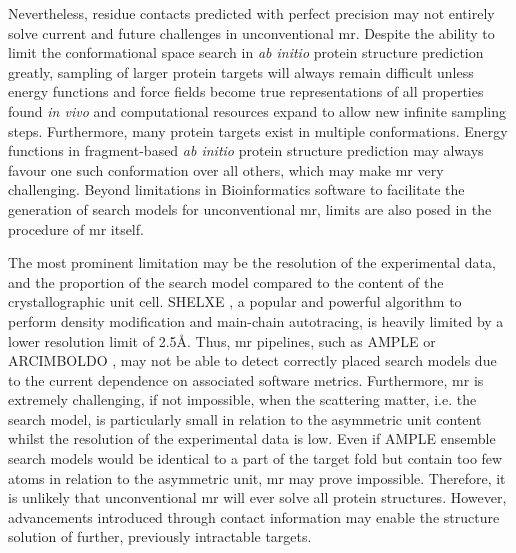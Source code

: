 Nevertheless, residue contacts predicted with perfect precision may not entirely solve current and future challenges in unconventional \gls{mr}. Despite the ability to limit the conformational space search in \textit{ab initio} protein structure prediction greatly, sampling of larger protein targets will always remain difficult unless energy functions and force fields become true representations of all properties found \textit{in vivo} and computational resources expand to allow new infinite sampling steps. Furthermore, many protein targets exist in multiple conformations. Energy functions in fragment-based \textit{ab initio} protein structure prediction may always favour one such conformation over all others, which may make \gls{mr} very challenging. Beyond limitations in Bioinformatics software to facilitate the generation of search models for unconventional \gls{mr}, limits are also posed in the procedure of \gls{mr} itself. 

The most prominent limitation may be the resolution of the experimental data, and the proportion of the search model compared to the content of the crystallographic unit cell. SHELXE \cite{Thorn2013-le}, a popular and powerful algorithm to perform density modification and main-chain autotracing, is heavily limited by a lower resolution limit of 2.5\AA. Thus, \gls{mr} pipelines, such as AMPLE \cite{Bibby2012-lm} or ARCIMBOLDO \cite{Sammito2015-dv}, may not be able to detect correctly placed search models due to the current dependence on associated software metrics. Furthermore, \gls{mr} is extremely challenging, if not impossible, when the scattering matter, i.e. the search model, is particularly small in relation to the asymmetric unit content whilst the resolution of the experimental data is low. Even if AMPLE ensemble search models would be identical to a part of the target fold but contain too few atoms in relation to the asymmetric unit, \gls{mr} may prove impossible. Therefore, it is unlikely that unconventional \gls{mr} will ever solve all protein structures. However, advancements introduced through contact information may enable the structure solution of further, previously intractable targets.
